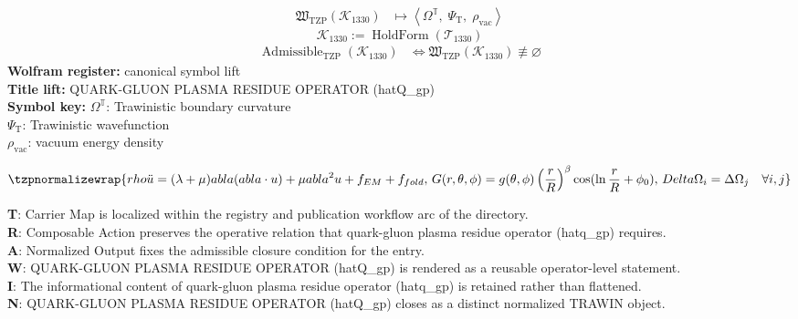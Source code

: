 \noindent
\begin{minipage}[t]{0.48\linewidth}
\begingroup
\small
\[
\begin{aligned}
\mathfrak{W}_{\mathrm{TZP}}\!\left(\mathcal{K}_{1330}\right)
&\longmapsto
\left\langle \Omega^{\mathbb{T}},\; \Psi_{\mathrm{T}},\; \rho_{\mathrm{vac}} \right\rangle
\end{aligned}
\]
\[
\mathcal{K}_{1330}
:=
\operatorname{HoldForm}\!\left(\mathcal{T}_{1330}\right)
\]
\[
\begin{aligned}
\operatorname{Admissible}_{\mathrm{TZP}}\!\left(\mathcal{K}_{1330}\right)
&\Longleftrightarrow
\mathfrak{W}_{\mathrm{TZP}}\!\left(\mathcal{K}_{1330}\right)\not\equiv\varnothing
\end{aligned}
\]
\textbf{Wolfram register:} canonical symbol lift\\
\textbf{Title lift:} QUARK-GLUON PLASMA RESIDUE OPERATOR (hatQ\_gp)\\
\textbf{Symbol key:} \(\Omega^{\mathbb{T}}\): Trawinistic boundary curvature\\ \(\Psi_{\mathrm{T}}\): Trawinistic wavefunction\\ \(\rho_{\mathrm{vac}}\): vacuum energy density
\par
\endgroup
\end{minipage}\hfill
\begin{minipage}[t]{0.48\linewidth}
\[
\tzpnormalizewrap{rho \ddot{u} = (\lambda + \mu)  abla( abla \cdot u) + \mu  abla^2 u + f_{EM} + f_{fold},\,G(r, \theta, \phi) = g(\theta, \phi) \left(\frac{r}{R}\right)^\beta \cos(\ln \frac{r}{R} + \phi_0),\,Delta \Omega_i = \Delta \Omega_j \quad \forall i, j}
\]

\small
\textbf{T}: Carrier Map is localized within the registry and publication workflow arc of the directory.\\
\textbf{R}: Composable Action preserves the operative relation that quark-gluon plasma residue operator (hatq\_gp) requires.\\
\textbf{A}: Normalized Output fixes the admissible closure condition for the entry.\\
\textbf{W}: QUARK-GLUON PLASMA RESIDUE OPERATOR (hatQ\_gp) is rendered as a reusable operator-level statement.\\
\textbf{I}: The informational content of quark-gluon plasma residue operator (hatq\_gp) is retained rather than flattened.\\
\textbf{N}: QUARK-GLUON PLASMA RESIDUE OPERATOR (hatQ\_gp) closes as a distinct normalized TRAWIN object.
\normalsize
\end{minipage}

